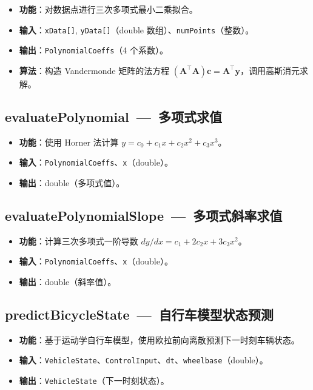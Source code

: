 \documentclass[a4paper,10pt]{article}
\begin{document}
\begin{itemize}
  \item \textbf{功能}：对数据点进行三次多项式最小二乘拟合。
  \item \textbf{输入}：\texttt{xData[]}, \texttt{yData[]}（double 数组）、\texttt{numPoints}（整数）。
  \item \textbf{输出}：\texttt{PolynomialCoeffs}（4 个系数）。
  \item \textbf{算法}：构造 Vandermonde 矩阵的法方程 $(\mathbf{A}^{\!\top}\!\mathbf{A})\mathbf{c} = \mathbf{A}^{\!\top}\!\mathbf{y}$，调用高斯消元求解。
\end{itemize}

\subsection{evaluatePolynomial~---~多项式求值}

\begin{itemize}
  \item \textbf{功能}：使用 Horner 法计算 $y = c_0 + c_1 x + c_2 x^2 + c_3 x^3$。
  \item \textbf{输入}：\texttt{PolynomialCoeffs}、\texttt{x}（double）。
  \item \textbf{输出}：double（多项式值）。
\end{itemize}

\subsection{evaluatePolynomialSlope~---~多项式斜率求值}

\begin{itemize}
  \item \textbf{功能}：计算三次多项式一阶导数 $dy/dx = c_1 + 2c_2 x + 3c_3 x^2$。
  \item \textbf{输入}：\texttt{PolynomialCoeffs}、\texttt{x}（double）。
  \item \textbf{输出}：double（斜率值）。
\end{itemize}

\subsection{predictBicycleState~---~自行车模型状态预测}

\begin{itemize}
  \item \textbf{功能}：基于运动学自行车模型，使用欧拉前向离散预测下一时刻车辆状态。
  \item \textbf{输入}：\texttt{VehicleState}、\texttt{ControlInput}、\texttt{dt}、\texttt{wheelbase}（double）。
  \item \textbf{输出}：\texttt{VehicleState}（下一时刻状态）。
\end{itemize}
\end{document}
